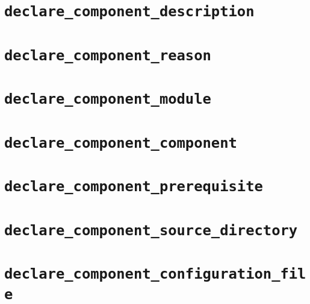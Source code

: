 \section{\texttt{declare\_component\_description}}\label{api:declare-component-description}
\section{\texttt{declare\_component\_reason}}\label{api:declare-component-reaso}
\section{\texttt{declare\_component\_module}}\label{api:declare-component-module}
\section{\texttt{declare\_component\_component}}\label{api:declare-component-component}
\section{\texttt{declare\_component\_prerequisite}}\label{api:declare-component-prerequisite}
\section{\texttt{declare\_component\_source\_directory}}\label{api:declare-component-source-directory}
\section{\texttt{declare\_component\_configuration\_file}}\label{api:declare-component-configuration-file}
